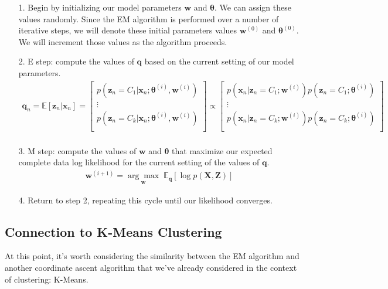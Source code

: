 \begin{itemize}
    \item[1.] Begin by initializing our model parameters $\textbf{w}$ and $\boldsymbol{\theta}$. We can assign these values randomly. Since the EM algorithm is performed over a number of iterative steps, we will denote these initial parameters values $\textbf{w}^{(0)}$ and $\boldsymbol{\theta}^{(0)}$. We will increment those values as the algorithm proceeds.
    \item[2.] E step: compute the values of $\textbf{q}$ based on the current setting of our model parameters.
    \begin{align*}
        \textbf{q}_n = \mathbb{E}[\textbf{z}_n | \textbf{x}_n] = \begin{bmatrix}
                p(\textbf{z}_n = C_1 | \textbf{x}_n; \boldsymbol{\theta}^{(i)}, \textbf{w}^{(i)}) \\
                \vdots \\
                p(\textbf{z}_n = C_k | \textbf{x}_n; \boldsymbol{\theta}^{(i)}, \textbf{w}^{(i)}) \\
            \end{bmatrix} 
            \propto \begin{bmatrix}
            p(\textbf{x}_n | \textbf{z}_n = C_1; \textbf{w}^{(i)})p(\textbf{z}_n = C_1; \boldsymbol{\theta}^{(i)}) \\
            \vdots \\
            p(\textbf{x}_n | \textbf{z}_n = C_k; \textbf{w}^{(i)})p(\textbf{z}_n = C_k; \boldsymbol{\theta}^{(i)}) \\
        \end{bmatrix} \\
    \end{align*}
    \item[3.] M step: compute the values of $\textbf{w}$ and $\boldsymbol{\theta}$ that maximize our expected complete data log likelihood for the current setting of the values of $\textbf{q}$.
    \begin{align*}
        \textbf{w}^{(i + 1)} = \underset{\textbf{w}}{\arg\max} \; \mathbb{E}_{\textbf{q}}[\log p(\textbf{X}, \textbf{Z})]
    \end{align*}
    \item[4.] Return to step 2, repeating this cycle until our likelihood converges.
\end{itemize}

\subsection{Connection to K-Means Clustering}
At this point, it's worth considering the similarity between the EM algorithm and another coordinate ascent algorithm that we've already considered in the context of clustering: K-Means.

